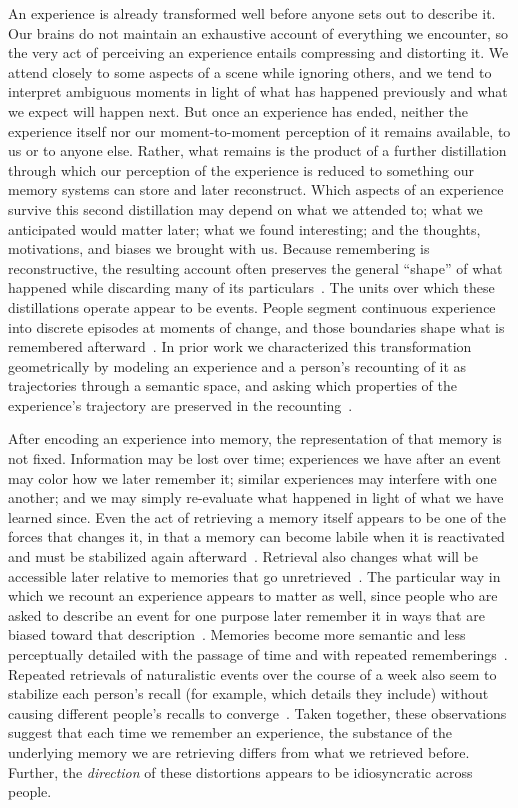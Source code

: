 \documentclass[10pt]{article}
\begin{document}
An experience is already transformed well before anyone sets out to describe it.
Our brains do not maintain an exhaustive account of everything we encounter, so the very act of perceiving an experience entails compressing and distorting it.
We attend closely to some aspects of a scene while ignoring others, and we tend to interpret ambiguous moments in light of what has happened previously and what we expect will happen next.
But once an experience has ended, neither the experience itself nor our moment-to-moment perception of it remains available, to us or to anyone else.
Rather, what remains is the product of a further distillation through which our perception of the experience is reduced to something our memory systems can store and later reconstruct.
Which aspects of an experience survive this second distillation may depend on what we attended to; what we anticipated would matter later; what we found interesting; and the thoughts, motivations, and biases we brought with us.
Because remembering is reconstructive, the resulting account often preserves the general ``shape'' of what happened while discarding many of its particulars~\citep{Bart32,SchaEtal11,Scha12}.
The units over which these distillations operate appear to be events.
People segment continuous experience into discrete episodes at moments of change, and those boundaries shape what is remembered afterward~\citep{RadvZack17,BaldEtal17}.
In prior work we characterized this transformation geometrically by modeling an experience and a person's recounting of it as trajectories through a semantic space, and asking which properties of the experience's trajectory are preserved in the recounting~\citep{HeusEtal21}.

After encoding an experience into memory, the representation of that memory is not fixed.
Information may be lost over time; experiences we have after an event may color how we later remember it; similar experiences may interfere with one another; and we may simply re-evaluate what happened in light of what we have learned since.
Even the act of retrieving a memory itself appears to be one of the forces that changes it, in that a memory can become labile when it is reactivated and must be stabilized again afterward~\citep{NadeEtal00,HupbEtal07,HupbEtal09,SedeEtal11}.
Retrieval also changes what will be accessible later relative to memories that go unretrieved~\citep{RoedKarp06a,KarpRoed07}.
The particular way in which we recount an experience appears to matter as well, since people who are asked to describe an event for one purpose later remember it in ways that are biased toward that description~\citep{TverMars00}.
Memories become more semantic and less perceptually detailed with the passage of time and with repeated rememberings~\citep{LifaEtal21}.
Repeated retrievals of naturalistic events over the course of a week also seem to stabilize each person's recall (for example, which details they include) without causing different people's recalls to converge~\citep{MeleEtal25}.
Taken together, these observations suggest that each time we remember an experience, the substance of the underlying memory we are retrieving differs from what we retrieved before.
Further, the \textit{direction} of these distortions appears to be idiosyncratic across people.
\end{document}
